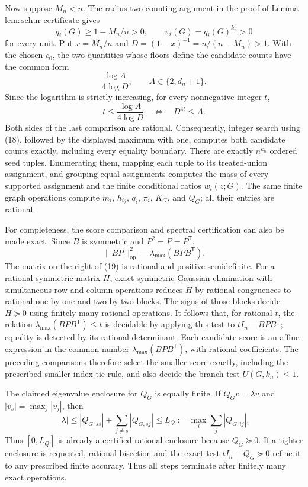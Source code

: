 Now suppose \(M_n<n\).  The radius-two counting argument in the proof of
Lemma~\(\mathrm{lem{:}schur\mbox{-}certificate}\) gives
\[
q_i(G)\ge1-M_n/n>0,
\qquad
\pi_i(G)=q_i(G)^{k_n}>0
\tag{17}
\]
for every unit.  Put \(x=M_n/n\) and
\(D=(1-x)^{-1}=n/(n-M_n)>1\).  With the chosen \(c_0\), the two quantities
whose floors define the candidate counts have the common form
\[
\frac{\log A}{4\log D},
\qquad A\in\{2,d_n+1\}.
\]
Since the logarithm is strictly increasing, for every nonnegative integer
\(t\),
\[
t\le\frac{\log A}{4\log D}
\quad\Longleftrightarrow\quad
D^{4t}\le A.
\tag{18}
\]
Both sides of the last comparison are rational.  Consequently, integer
search using (18), followed by the displayed maximum with one, computes
both candidate counts exactly, including every equality boundary.  There
are exactly \(n^{k_n}\) ordered seed tuples.  Enumerating them, mapping each
tuple to its treated-union assignment, and grouping equal assignments
computes the mass of every supported assignment and the finite conditional
ratios \(w_i(z;G)\).
The same finite graph operations compute \(m_i\), \(h_{ij}\), \(q_i\),
\(\pi_i\), \(K_G\), and \(Q_G\); all their entries are rational.

For completeness, the score comparison and spectral certification can also
be made exact.  Since \(B\) is symmetric and \(P^2=P=P^{\mathsf T}\),
\[
\|BP\|_{\mathrm{op}}^2
=\lambda_{\max}(BPB^{\mathsf T}).
\tag{19}
\]
The matrix on the right of (19) is rational and positive semidefinite.  For
a rational symmetric matrix \(H\), exact symmetric Gaussian elimination
with simultaneous row and column operations reduces \(H\) by rational
congruences to rational one-by-one and two-by-two blocks.  The signs of
those blocks decide \(H\succeq0\) using finitely many rational operations.
It follows that, for rational \(t\), the relation
\(\lambda_{\max}(BPB^{\mathsf T})\le t\) is decidable by applying this test
to \(tI_n-BPB^{\mathsf T}\); equality is detected by its rational
determinant.  Each candidate score is an affine expression in the common
number \(\lambda_{\max}(BPB^{\mathsf T})\), with rational coefficients.
The preceding comparisons therefore select the smaller score exactly,
including the prescribed smaller-index tie rule, and also decide the branch
test \(U(G,k_n)\le1\).

The claimed eigenvalue enclosure for \(Q_G\) is equally finite.  If
\(Q_Gv=\lambda v\) and \(|v_s|=\max_j|v_j|\), then
\[
|\lambda|\le |Q_{G,ss}|+\sum_{j\ne s}|Q_{G,sj}|
\le L_Q:=\max_i\sum_j|Q_{G,ij}|.
\]
Thus \([0,L_Q]\) is already a certified rational enclosure because
\(Q_G\succeq0\).  If a tighter enclosure is requested, rational bisection
and the exact test \(tI_n-Q_G\succeq0\) refine it to any prescribed finite
accuracy.  Thus all steps terminate after finitely many exact operations.

